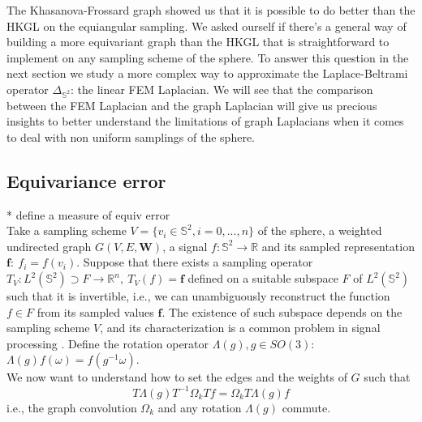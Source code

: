 \documentclass{article} %
\begin{document}
The Khasanova-Frossard graph showed us that it is possible to do better than the HKGL on the equiangular sampling. We asked ourself if there's a general way of building a more equivariant graph than the HKGL that is straightforward to implement on any sampling scheme of the sphere. To answer this question in the next section we study a more complex way to approximate the Laplace-Beltrami operator $\Delta_{\mathbb S^2}$: the linear FEM Laplacian. We will see that the comparison between the FEM Laplacian and the graph Laplacian will give us precious insights to better understand the limitations of graph Laplacians when it comes to deal with non uniform samplings of the sphere.

\subsection{Equivariance error}

* define a measure of equiv error\\
Take a sampling scheme $V=\{v_i\in\mathbb S^2, i=0, ..., n\}$ of the sphere, a weighted undirected graph $G(V, E, \mathbf W)$, a signal $f: \mathbb S^2\to\mathbb R$ and its sampled representation $\mathbf f:\ f_i=f(v_i)$. Suppose that there exists a sampling operator $T_V: L^2(\mathbb S^2) \supset F\to \mathbb R^n,\  T_V(f) = \mathbf f$ defined on a suitable subspace $F$ of $L^2(\mathbb S^2)$ such that it is invertible, i.e., we can unambiguously reconstruct the function $f\in F$ from its sampled values $\mathbf f$. The existence of such subspace depends on the sampling scheme $V$, and its characterization is a common problem in signal processing \cite{Driscoll:1994:CFT:184069.184073}. Define the rotation operator $\Lambda(g), g\in SO(3)$: $\Lambda(g) f(\omega)=f\left(g^{-1} \omega\right)$.\\

We now want to understand how to set the edges and the weights of $G$ such that
\begin{equation}\label{eq:equivariance}
T \Lambda(g) T^{-1} \Omega_k T f = \Omega_k T \Lambda(g) f
\end{equation}
i.e., the graph convolution $\Omega_k$ and any rotation $\Lambda(g)$ commute.
\end{document}
